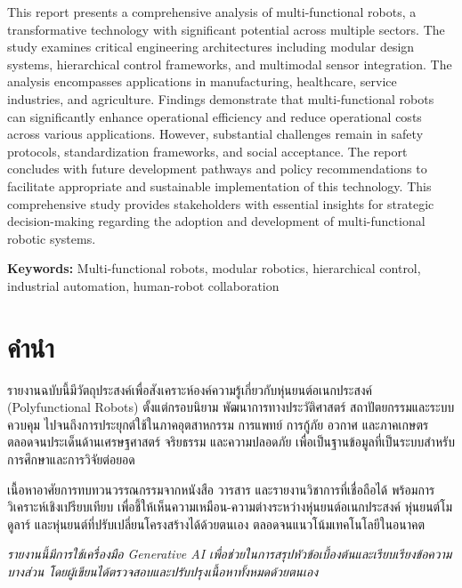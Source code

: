 \documentclass[a4paper]{article}
\begin{document}
This report presents a comprehensive analysis of multi-functional robots, a transformative technology with significant potential across multiple sectors. The study examines critical engineering architectures including modular design systems, hierarchical control frameworks, and multimodal sensor integration. The analysis encompasses applications in manufacturing, healthcare, service industries, and agriculture. Findings demonstrate that multi-functional robots can significantly enhance operational efficiency and reduce operational costs across various applications. However, substantial challenges remain in safety protocols, standardization frameworks, and social acceptance. The report concludes with future development pathways and policy recommendations to facilitate appropriate and sustainable implementation of this technology. This comprehensive study provides stakeholders with essential insights for strategic decision-making regarding the adoption and development of multi-functional robotic systems.

\vspace{1em}

\noindent
\textbf{Keywords:} Multi-functional robots, modular robotics, hierarchical control, industrial automation, human-robot collaboration

\newpage

\tableofcontents
\newpage
\setcounter{page}{1}

\section*{คำนำ}
รายงานฉบับนี้มีวัตถุประสงค์เพื่อสังเคราะห์องค์ความรู้เกี่ยวกับหุ่นยนต์อเนกประสงค์ (Polyfunctional Robots) ตั้งแต่กรอบนิยาม พัฒนาการทางประวัติศาสตร์ สถาปัตยกรรมและระบบควบคุม ไปจนถึงการประยุกต์ใช้ในภาคอุตสาหกรรม การแพทย์ การกู้ภัย อวกาศ และภาคเกษตร ตลอดจนประเด็นด้านเศรษฐศาสตร์ จริยธรรม และความปลอดภัย เพื่อเป็นฐานข้อมูลที่เป็นระบบสำหรับการศึกษาและการวิจัยต่อยอด

เนื้อหาอาศัยการทบทวนวรรณกรรมจากหนังสือ วารสาร และรายงานวิชาการที่เชื่อถือได้ พร้อมการวิเคราะห์เชิงเปรียบเทียบ เพื่อชี้ให้เห็นความเหมือน-ความต่างระหว่างหุ่นยนต์อเนกประสงค์ หุ่นยนต์โมดูลาร์ และหุ่นยนต์ที่ปรับเปลี่ยนโครงสร้างได้ด้วยตนเอง ตลอดจนแนวโน้มเทคโนโลยีในอนาคต

{\itshape รายงานนี้มีการใช้เครื่องมือ Generative AI เพื่อช่วยในการสรุปหัวข้อเบื้องต้นและเรียบเรียงข้อความบางส่วน โดยผู้เขียนได้ตรวจสอบและปรับปรุงเนื้อหาทั้งหมดด้วยตนเอง}
\end{document}
